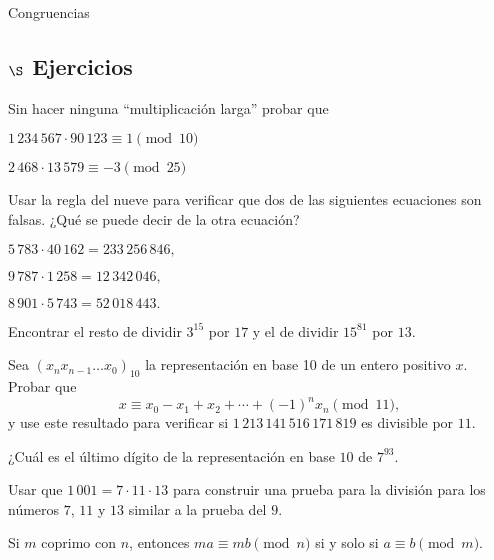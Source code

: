 \begin{section}{Congruencias}
\subsection*{$\S$ Ejercicios}

\begin{enumex}
\item Sin hacer ninguna ``multiplicación larga'' probar que
\begin{enumex}
    \item $1\,234\,567 \cdot 90\,123 \equiv 1 \pmod{10}$
    
    \item $2\,468 \cdot 13\,579 \equiv -3 \pmod{25}$
\end{enumex}

\item Usar la regla del nueve para verificar que dos de las siguientes ecuaciones son falsas. ¿Qué se puede decir de la otra ecuación?
\begin{enumex}
    \item  $5\,783 \cdot 40\,162  = 233\,256\,846 ,$
    
    \item  $9\,787 \cdot 1\,258  = 12\,342\,046 , $
    
    \item  $ 8\,901 \cdot 5\,743  = 52\,018\,443 .$
\end{enumex}

\item Encontrar el resto de dividir $3^{15}$ por $17$ y el de dividir $15^{81}$ por $13$.
\item  Sea $(x_nx_{n-1}\ldots x_0)_{10}$ la representación en base 10 de un entero positivo $x$. Probar que
$$
x\equiv x_0-x_1+x_2+\cdots +(-1)^nx_n \pmod{11},
$$
y use este resultado para verificar si $1\,213\,141\,516\,171\,819$
es divisible por $11$.

\item ¿Cuál es el último dígito de la representación en base $10$ de
$7^{93}$.

\item Usar que $1\,001=7\cdot 11 \cdot 13$ para construir una prueba
para la división para los números $7$, $11$ y $13$ similar a la prueba
del $9$.


\item Si $m$ coprimo con $n$, entonces $ma\equiv mb \pmod{n}$ si y solo
si $a\equiv b\pmod{m}$.

\end{enumex}

\end{section}


